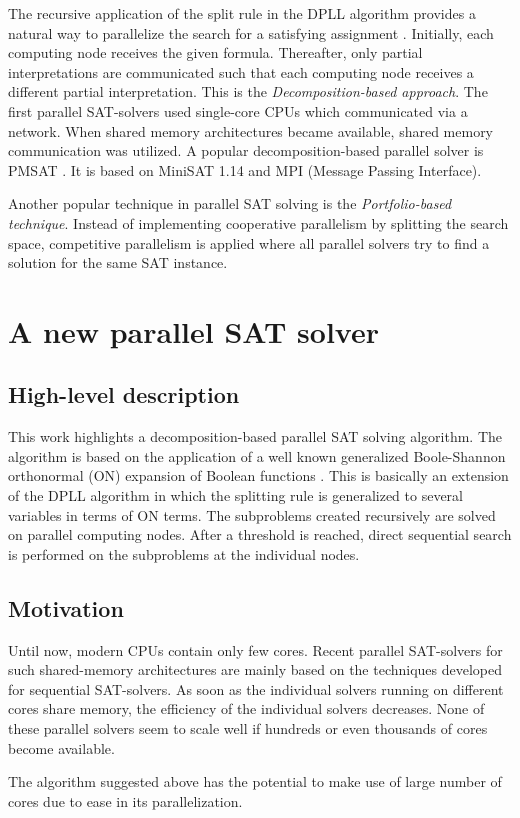 The recursive application of the split rule in the
DPLL algorithm provides a natural way to parallelize
the search for a satisfying assignment \cite{overview}. Initially, each computing node receives
the given formula. Thereafter, only partial interpretations
are communicated such that each computing
node receives a different partial interpretation. This is the \textit{Decomposition-based approach}. The
first parallel SAT-solvers used single-core CPUs which
communicated via a network. When shared memory
architectures became available, shared memory communication
was utilized. A popular decomposition-based parallel solver is PMSAT \cite{pmsat}. It is based on MiniSAT 1.14 and MPI (Message Passing Interface).


Another popular technique in parallel SAT solving is the \textit{Portfolio-based technique}. Instead of implementing cooperative parallelism by splitting the
search space, competitive parallelism is applied where all parallel
solvers try to find a solution for the same SAT instance. 

\section{A new parallel SAT solver}

\subsection{High-level description}
This work highlights a decomposition-based parallel SAT solving algorithm. The algorithm is based on the application of a well
known generalized Boole-Shannon orthonormal (ON) expansion of Boolean functions \cite{sule14}. This is basically an extension of the DPLL algorithm in which the splitting rule is generalized to several variables in terms of ON terms. The subproblems created recursively are solved on parallel computing nodes. After a threshold is reached, direct sequential search is performed on the subproblems at the individual nodes.

\subsection{Motivation}
Until now, modern CPUs contain only few cores.
Recent parallel SAT-solvers for such shared-memory
architectures are mainly based on the techniques developed
for sequential SAT-solvers. As soon as the individual
solvers running on different cores share memory,
the efficiency of the individual solvers decreases. None
of these parallel solvers seem to scale well if hundreds
or even thousands of cores become available. 

The algorithm suggested above has the potential to make use of large number of cores due to ease in its parallelization.
